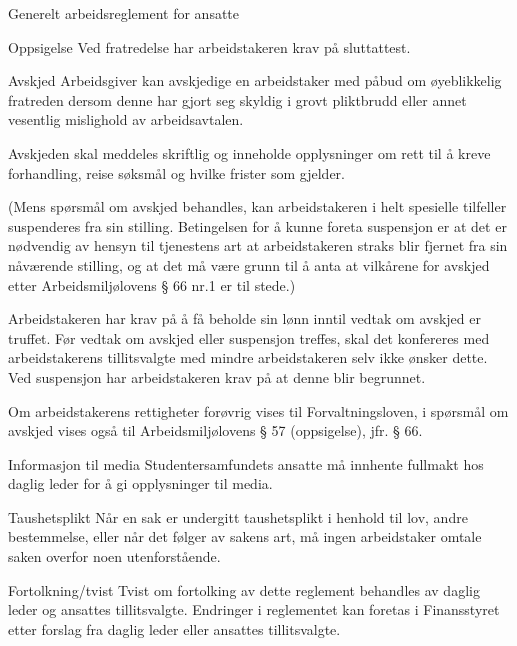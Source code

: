 \begin{lovkapittel}{Generelt arbeidsreglement for ansatte}
\begin{lovparagraf}{Oppsigelse}
        Ved fratredelse har arbeidstakeren krav på sluttattest.
    \end{lovparagraf}

    \begin{lovparagraf}{Avskjed}
        Arbeidsgiver kan avskjedige en arbeidstaker med påbud om øyeblikkelig fratreden dersom denne har gjort seg skyldig
        i grovt pliktbrudd eller annet vesentlig mislighold av arbeidsavtalen.

        Avskjeden skal meddeles skriftlig og inneholde opplysninger om rett til å kreve forhandling, reise søksmål og hvilke
        frister som gjelder.

        (Mens spørsmål om avskjed behandles, kan arbeidstakeren i helt spesielle tilfeller suspenderes fra sin stilling.
        Betingelsen for å kunne foreta suspensjon er at det er nødvendig av hensyn til tjenestens art at arbeidstakeren straks
        blir fjernet fra sin nåværende stilling, og at det må være grunn til å anta at vilkårene for avskjed etter
        Arbeidsmiljølovens § 66 nr.1 er til stede.)

        Arbeidstakeren har krav på å få beholde sin lønn inntil vedtak om avskjed er truffet.
        Før vedtak om avskjed eller suspensjon treffes, skal det konfereres med arbeidstakerens tillitsvalgte med mindre
        arbeidstakeren selv ikke ønsker dette. Ved suspensjon har arbeidstakeren krav på at denne blir begrunnet.

        Om arbeidstakerens rettigheter forøvrig vises til Forvaltningsloven, i spørsmål om avskjed vises også til
        Arbeidsmiljølovens § 57 (oppsigelse), jfr. § 66.
    \end{lovparagraf}

    \begin{lovparagraf}{Informasjon til media}
        Studentersamfundets ansatte må innhente fullmakt hos daglig leder for å gi opplysninger til media.

    \end{lovparagraf}

    \begin{lovparagraf}{Taushetsplikt}
        Når en sak er undergitt taushetsplikt i henhold til lov, andre bestemmelse, eller når det følger av sakens art, må ingen
        arbeidstaker omtale saken overfor noen utenforstående.
    \end{lovparagraf}

    \begin{lovparagraf}{Fortolkning/tvist}
        Tvist om fortolking av dette reglement behandles av daglig leder og ansattes tillitsvalgte. Endringer i reglementet kan
        foretas i Finansstyret etter forslag fra daglig leder eller ansattes tillitsvalgte.
    \end{lovparagraf}
\end{lovkapittel}


